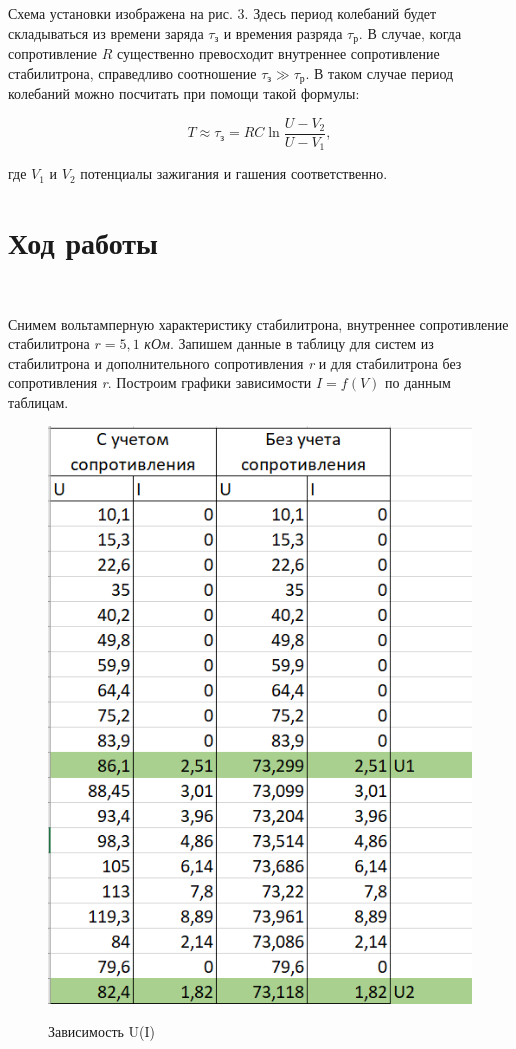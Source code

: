 \documentclass[11pt]{article}
\begin{document}
Схема установки изображена на рис. 3. Здесь период колебаний будет складываться из времени заряда $\tau_{\textit{з}}$ и времения разряда $\tau_{\textit{р}}$. В случае, когда сопротивление $R$ существенно превосходит внутреннее сопротивление стабилитрона, справедливо соотношение $\tau_{\textit{з}} \gg \tau_{\textit{р}}$. В таком случае период колебаний можно посчитать при помощи такой формулы:

\begin{equation}
T \approx \tau_{\textit{з}} = RC\ln \frac{U - V_2}{U - V_1},
\end{equation}

где $V_1$ и $V_2$ потенциалы зажигания и гашения соответственно.

\newpage

\section*{Ход работы}\

Снимем вольтамперную характеристику стабилитрона, внутреннее сопротивление стабилитрона $r = 5,1$ \textit{кОм}. Запишем данные в таблицу для систем из стабилитрона и дополнительного сопротивления \textit{r} и для стабилитрона без сопротивления \textit{r}. Построим графики зависимости $I = f(V)$ по данным таблицам.

\begin{figure}[h!]
\centering
\includegraphics[scale=1]{table1.png}
\label{fig:Image1}
\caption{Зависимость U(I)}
\end{figure}
\end{document}
